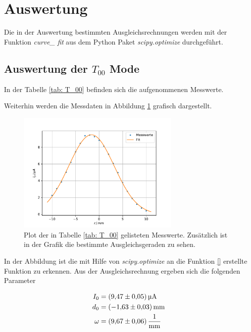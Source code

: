 \section{Auswertung}

Die in der Auswertung bestimmten Ausgleichsrechnungen werden mit
der Funktion \emph{curve\_ fit} \cite{scipy} aus dem Python Paket \emph{scipy.optimize}\cite{scipy} durchgeführt.

\subsection{Auswertung der $T_{00}$ Mode}
\FloatBarrier
In der Tabelle \ref{tab: T_00} befinden sich die aufgenommenen Messwerte.

Weiterhin werden die Messdaten in Abbildung \ref{fig: T_00} grafisch dargestellt.
\begin{figure}[h!]
  \centering
  \includegraphics[width=0.7\textwidth]{../Messdaten/plots/T_00.pdf}
  \caption{Plot der in Tabelle \ref{tab: T_00} gelisteten Messwerte. Zusätzlich ist in der Grafik die bestimmte Ausgleichsgeraden zu sehen.}
  \label{fig: T_00}
\end{figure}
In der Abbildung ist die mit Hilfe von \emph{scipy.optimize} an die Funktion \eqref{} erstellte Funktion zu erkennen.
Aus der Ausgleichsrechnung ergeben sich die folgenden Parameter

\begin{align}
  \label{eq: fit_t_00}
  \begin{aligned}
  I_0&=\SI{9.47 \pm 0.05}{\micro\ampere}\\
  d_0&=\SI{-1.63\pm 0.03}{\milli\meter}\\
  \omega&=\SI{9.67\pm0.06}{\per\milli\meter}
\end{aligned}
\end{align}
\FloatBarrier
